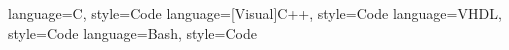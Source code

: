  {language=C, style=Code}
 {language=[Visual]C++, style=Code}
 {language=VHDL, style=Code}
 {language=Bash, style=Code}

\usepackage{bookman}                  
\usepackage[T1]{fontenc}              
\usepackage[utf8]{inputenc}         
\usepackage[english]{babel}        
\usepackage[bf,small,raggedright,compact]{titlesec}
\usepackage[parfill]{parskip}
\usepackage{setspace}
\setcounter{secnumdepth}{3}

\usepackage{tabularx}
\usepackage{multirow} 
\usepackage{multicol} 
\usepackage{booktabs}

\usepackage{cite}
\usepackage{appendix}
\usepackage{amssymb}
\usepackage{url}
